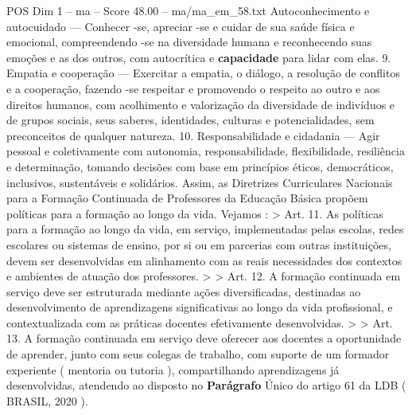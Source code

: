 \begin{textsample}{POS Dim 1 – ma – Score 48.00 – ma/ma\_em\_58.txt}
Autoconhecimento e autocuidado — Conhecer -se, apreciar -se e cuidar de sua saúde física e emocional, compreendendo -se na diversidade humana e reconhecendo suas emoções e as dos outros, com autocrítica e \textbf{capacidade} para lidar com elas. 9.
Empatia e cooperação — Exercitar a empatia, o diálogo, a resolução de conflitos e a cooperação, fazendo -se respeitar e promovendo o respeito ao outro e aos direitos humanos, com acolhimento e valorização da diversidade de indivíduos e de grupos sociais, seus saberes, identidades, culturas e potencialidades, sem preconceitos de qualquer natureza. 10.
Responsabilidade e cidadania — Agir pessoal e coletivamente com autonomia, responsabilidade, flexibilidade, resiliência e determinação, tomando decisões com base em princípios éticos, democráticos, inclusivos, sustentáveis e solidários.
Assim, as Diretrizes Curriculares Nacionais para a Formação Continuada de Professores da Educação Básica propõem políticas para a formação ao longo da vida.
Vejamos : > Art. 11.
As políticas para a formação ao longo da vida, em serviço, implementadas pelas escolas, redes escolares ou sistemas de ensino, por si ou em parcerias com outras instituições, devem ser desenvolvidas em alinhamento com as reais necessidades dos contextos e ambientes de atuação dos professores. > > Art. 12.
A formação continuada em serviço deve ser estruturada mediante ações diversificadas, destinadas ao desenvolvimento de aprendizagens significativas ao longo da vida profissional, e contextualizada com as práticas docentes efetivamente desenvolvidas. > > Art. 13.
A formação continuada em serviço deve oferecer aos docentes a oportunidade de aprender, junto com seus colegas de trabalho, com suporte de um formador experiente ( mentoria ou tutoria ), compartilhando aprendizagens já desenvolvidas, atendendo ao disposto no \textbf{Parágrafo} Único do artigo 61 da LDB ( BRASIL, 2020 ).

\end{textsample}

